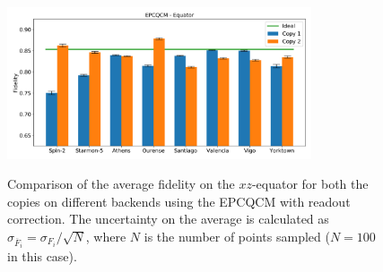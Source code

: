 \begin{figure}[H]
  \centering
          \includegraphics[width=0.8\textwidth]{Figures/Economical/Histograms/histo_equator_corrected.png}
      \label{fig:epc_histo_equator_corrected}
      \caption{Comparison of the average fidelity on the $xz$-equator for both the copies on different backends using the EPCQCM with readout correction. The uncertainty on the average is calculated as $\sigma_{\overline{F}_i}=\sigma_{F_i}/\sqrt{N}$, where $N$ is the number of points sampled ($N=100$ in this case).}
\end{figure}


